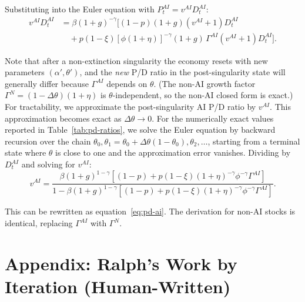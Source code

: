 \documentclass[12pt]{article}
\begin{document}
Substituting into the Euler equation with $P_t^{AI} = v^{AI} D_t^{AI}$:
\begin{equation} \label{eq:euler-expand}
\begin{split}
v^{AI} D_t^{AI} &= \beta(1+g)^{-\gamma} \Big[ (1-p)(1+g)(v^{AI}+1) D_t^{AI} \\
&\quad + p(1-\xi) [\phi(1+\eta)]^{-\gamma} (1+g) \, \Gamma^{AI} (v^{AI}+1) D_t^{AI} \Big].
\end{split}
\end{equation}

Note that after a non-extinction singularity the economy resets with new parameters $(\alpha', \theta')$, and the \emph{new} P/D ratio in the post-singularity state will generally differ because $\Gamma^{AI}$ depends on $\theta$. (The non-AI growth factor $\Gamma^{N} = (1-\Delta\theta)(1+\eta)$ is $\theta$-independent, so the non-AI closed form is exact.) For tractability, we approximate the post-singularity AI P/D ratio by $v^{AI}$. This approximation becomes exact as $\Delta\theta \to 0$. For the numerically exact values reported in Table~\ref{tab:pd-ratios}, we solve the Euler equation by backward recursion over the chain $\theta_0, \theta_1 = \theta_0 + \Delta\theta(1-\theta_0), \theta_2, \ldots$, starting from a terminal state where $\theta$ is close to one and the approximation error vanishes. Dividing by $D_t^{AI}$ and solving for $v^{AI}$:
%
\begin{equation}
v^{AI} = \frac{\beta(1+g)^{1-\gamma}\left[(1-p) + p(1-\xi)(1+\eta)^{-\gamma}\phi^{-\gamma} \Gamma^{AI}\right]}{1 - \beta(1+g)^{1-\gamma}\left[(1-p) + p(1-\xi)(1+\eta)^{-\gamma}\phi^{-\gamma} \Gamma^{AI}\right]}. \label{eq:pd-ai-solve}
\end{equation}

This can be rewritten as equation~\eqref{eq:pd-ai}. The derivation for non-AI stocks is identical, replacing $\Gamma^{AI}$ with $\Gamma^{N}$.

\clearpage
\section{Appendix: Ralph's Work by Iteration (Human-Written)} \label{appendix:iter-log}

\providecommand{\rloopcommit}[2]{\href{https://github.com/redacted/ralph-wiggum-asset-pricing/commit/#2}{\textcolor{blue}{\texttt{#1}}}}
\providecommand{\testresult}[1]{\href{https://github.com/redacted/ralph-wiggum-asset-pricing/blob/42ce3a298a6c9e9ec144949346034b8af9055646/test-results/#1.md}{\textcolor{blue}{\texttt{#1}}}}
\providecommand{\penultimatetestresult}[1]{\href{https://github.com/redacted/ralph-wiggum-asset-pricing/blob/36c13367ef5980dcf1e7e4963d89a7722c8377d0/test-results/#1.md}{\textcolor{blue}{\texttt{#1}}}}
\providecommand{\finaltestresult}[1]{\href{https://github.com/redacted/ralph-wiggum-asset-pricing/blob/bf0af226ad2d15302dbe1c2878a1c2f66192e340/test-results/#1.md}{\textcolor{blue}{\texttt{#1}}}}
\end{document}
